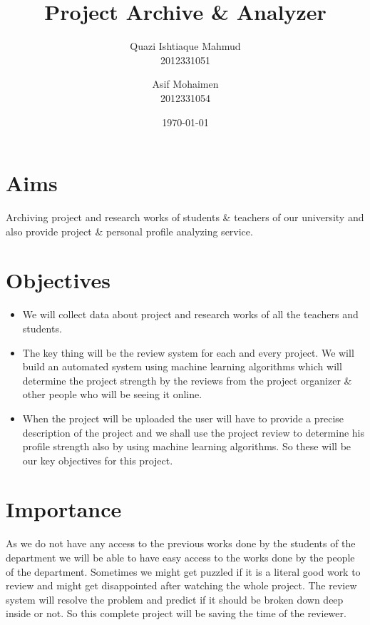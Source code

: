 \documentclass[dvips,12pt]{article}
\begin{document}
\title{Project Archive \& Analyzer}
\author{
  Quazi Ishtiaque Mahmud\\
  2012331051
  \and
  Asif Mohaimen\\
  2012331054
}
\date{\today}




\maketitle


\section{Aims}

Archiving project and research works of students \& teachers of our university and also provide project \& personal profile analyzing service.



\section{Objectives}

\begin{itemize}
\item We will collect data about project and research works of all the teachers and students.
\item The key thing will be the review system for each and every project. We will build an automated system using machine learning algorithms which will determine the project strength by the reviews from the project organizer \& other people who will be seeing it online.
\item When the project will be uploaded the user will have to provide a precise description of the project and we shall use the project review to determine his profile strength also by using machine learning algorithms. So these will be our key objectives for this project.
\end{itemize}

\section{Importance}

As we do not have any access to the previous works done by the students of the department we will be able to have easy access to the works done by the people of the department. Sometimes we might get puzzled if it is a literal good work to review and might get disappointed after watching the whole project. The review system will resolve the problem and predict if it should be broken down deep inside or not. So this complete project will be saving the time of the reviewer.
\end{document}
